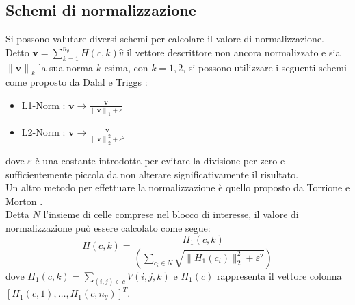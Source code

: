 \subsection{Schemi di normalizzazione}
Si possono valutare diversi schemi per calcolare il valore di normalizzazione. \\
Detto $\textbf{v}= \sum_{k=1}^{n_\theta} H(c,k)\hat{v}$ il vettore descrittore non ancora normalizzato e sia ${\|\textbf{v}\|}_{k}$ la sua norma $k$-esima, con $k=1,2$, si possono utilizzare i seguenti schemi come proposto da Dalal e Triggs \citep{Art_HOGHuman}:
\begin{itemize}
\item L1-Norm : $\textbf{v} \rightarrow\frac{\textbf{v}}{{\|\textbf{v}\|}_{1}+\varepsilon} $
\item L2-Norm :  $\textbf{v} \rightarrow\frac{\textbf{v}}{{\|\textbf{v}\|}_{2}^2+{\varepsilon}^2} $
\end{itemize}
dove $\varepsilon$ è una costante introdotta per evitare la divisione per zero e sufficientemente piccola da non alterare significativamente il risultato.
\\
Un altro metodo per effettuare la normalizzazione è quello proposto da Torrione e Morton \citep{Art_HOGLandmine}. \\
Detta $N$ l'insieme di celle comprese nel blocco di interesse, il valore di normalizzazione può essere calcolato come segue:
\begin{equation}
\label{eq:normalizzazione}
H(c,k)= \frac{H_{1}(c,k)}{\left ( \sum_{c_i\in N} \sqrt{\|H_{1}(c_i)\|^2_2+\varepsilon^2}\right )}
\end{equation}
dove $H_1(c,k)=\sum_{(i,j)\in c}V(i,j,k)$ e $H_1(c)$ rappresenta il vettore colonna\\
 $[H_1(c,1),\ldots, H_1(c,n_{\theta}) ]^T$.
 
